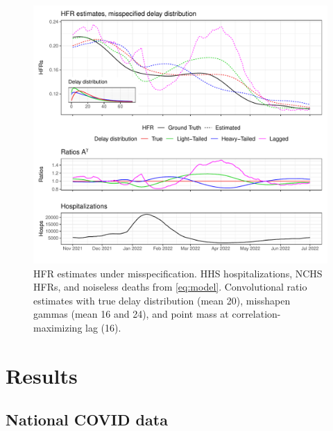 \documentclass{article}
\begin{document}
\begin{figure}
    \centering
    \includegraphics[width=.8\linewidth]{Figs/Simulated/toy_misp.pdf}
    \caption{HFR estimates under misspecification. HHS hospitalizations, NCHS HFRs, and noiseless deaths from \eqref{eq:model}. Convolutional ratio estimates with true delay distribution (mean 20), misshapen gammas (mean 16 and 24), and point mass at correlation-maximizing lag (16).}%
    \label{fig:misspecified}
\end{figure}




\section{Results}\label{sec:results}

\subsection{National COVID data}\label{sec:results_real}
\end{document}
